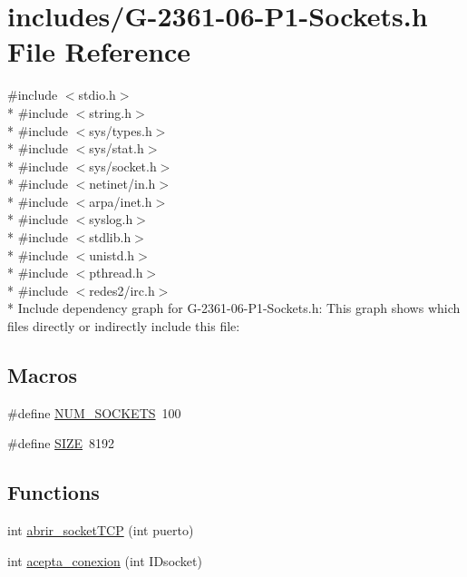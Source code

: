 \hypertarget{_g-2361-06-_p1-_sockets_8h}{}\section{includes/\+G-\/2361-\/06-\/\+P1-\/\+Sockets.h File Reference}
\label{_g-2361-06-_p1-_sockets_8h}
{\ttfamily \#include $<$stdio.\+h$>$}\\*
{\ttfamily \#include $<$string.\+h$>$}\\*
{\ttfamily \#include $<$sys/types.\+h$>$}\\*
{\ttfamily \#include $<$sys/stat.\+h$>$}\\*
{\ttfamily \#include $<$sys/socket.\+h$>$}\\*
{\ttfamily \#include $<$netinet/in.\+h$>$}\\*
{\ttfamily \#include $<$arpa/inet.\+h$>$}\\*
{\ttfamily \#include $<$syslog.\+h$>$}\\*
{\ttfamily \#include $<$stdlib.\+h$>$}\\*
{\ttfamily \#include $<$unistd.\+h$>$}\\*
{\ttfamily \#include $<$pthread.\+h$>$}\\*
{\ttfamily \#include $<$redes2/irc.\+h$>$}\\*
Include dependency graph for G-\/2361-\/06-\/\+P1-\/\+Sockets.h\+:
This graph shows which files directly or indirectly include this file\+:
\subsection*{Macros}
\begin{DoxyCompactItemize}
\item 
\#define \hyperlink{_g-2361-06-_p1-_sockets_8h_a1c803e4ececfb47d2791c9283c85eb00}{N\+U\+M\+\_\+\+S\+O\+C\+K\+E\+T\+S}~100
\item 
\#define \hyperlink{_g-2361-06-_p1-_sockets_8h_a70ed59adcb4159ac551058053e649640}{S\+I\+Z\+E}~8192
\end{DoxyCompactItemize}
\subsection*{Functions}
\begin{DoxyCompactItemize}
\item 
int \hyperlink{_g-2361-06-_p1-_sockets_8h_af2f55f83053c8fdebb8da511cd65880c}{abrir\+\_\+socket\+T\+C\+P} (int puerto)
\item 
int \hyperlink{_g-2361-06-_p1-_sockets_8h_a172e85f036cff044fd5ba218460115c7}{acepta\+\_\+conexion} (int I\+Dsocket)
\end{DoxyCompactItemize}


